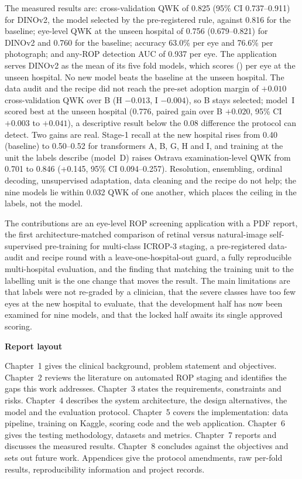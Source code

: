 The measured results are: cross-validation QWK of 0.825 (95\% CI 0.737--0.911) for DINOv2, the model selected by the pre-registered rule, against 0.816 for the baseline; eye-level QWK at the unseen hospital of 0.756 (0.679--0.821) for DINOv2 and 0.760 for the baseline; accuracy 63.0\% per eye and 76.6\% per photograph; and any-ROP detection AUC of 0.937 per eye. The application serves DINOv2 as the mean of its five fold models, which scores \DeployedQWK{} (\DeployedQWKCI) per eye at the unseen hospital. No new model beats the baseline at the unseen hospital. The data audit and the recipe did not reach the pre-set adoption margin of $+0.010$ cross-validation QWK over B (H $-0.013$, I $-0.004$), so B stays selected; model~I scored best at the unseen hospital (0.776, paired gain over B $+0.020$, 95\% CI $+0.003$ to $+0.041$), a descriptive result below the 0.08 difference the protocol can detect. Two gains are real. Stage-1 recall at the new hospital rises from 0.40 (baseline) to 0.50--0.52 for transformers A, B, G, H and I, and training at the unit the labels describe (model~D) raises Ostrava examination-level QWK from 0.701 to 0.846 (+0.145, 95\% CI 0.094--0.257). Resolution, ensembling, ordinal decoding, unsupervised adaptation, data cleaning and the recipe do not help; the nine models lie within 0.032 QWK of one another, which places the ceiling in the labels, not the model.

The contributions are an eye-level ROP screening application with a PDF report, the first architecture-matched comparison of retinal versus natural-image self-supervised pre-training for multi-class ICROP-3 staging, a pre-registered data-audit and recipe round with a leave-one-hospital-out guard, a fully reproducible multi-hospital evaluation, and the finding that matching the training unit to the labelling unit is the one change that moves the result. The main limitations are that labels were not re-graded by a clinician, that the severe classes have too few eyes at the new hospital to evaluate, that the development half has now been examined for nine models, and that the locked half awaits its single approved scoring.

\noindent\textbf{Report layout}\par
\noindent Chapter~1 gives the clinical background, problem statement and objectives. Chapter~2 reviews the literature on automated ROP staging and identifies the gaps this work addresses. Chapter~3 states the requirements, constraints and risks. Chapter~4 describes the system architecture, the design alternatives, the model and the evaluation protocol. Chapter~5 covers the implementation: data pipeline, training on Kaggle, scoring code and the web application. Chapter~6 gives the testing methodology, datasets and metrics. Chapter~7 reports and discusses the measured results. Chapter~8 concludes against the objectives and sets out future work. Appendices give the protocol amendments, raw per-fold results, reproducibility information and project records.

